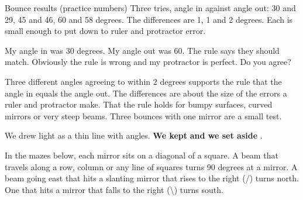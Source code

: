 \begin{worked}{Bounce results (practice numbers)}
Three tries, angle in against angle out: 30 and 29, 45 and 46, 60 and 58 degrees. The differences are 1, 1 and 2 degrees. Each is small enough to put down to ruler and protractor error.
\end{worked}

\begin{multix}[hmm]\multixbot[hmm]\tcblower
My angle in was 30 degrees. My angle out was 60. The rule says they should match. Obviously the rule is wrong and my protractor is perfect. Do you agree?
\end{multix}

{Three different angles agreeing to within 2 degrees supports the rule that the angle in equals the angle out. The differences are about the size of the errors a ruler and protractor make.}
{That the rule holds for bumpy surfaces, curved mirrors or very steep beams. Three bounces with one mirror are a small test.}

\begin{keepbox}
We drew light as a thin line with angles. \textbf{We kept} \wline[3.4cm] \textbf{and we set aside} \wline[3.4cm].
\end{keepbox}

\clearpage

In the mazes below, each mirror sits on a diagonal of a square. A beam that travels along a row, column or any line of squares turns 90 degrees at a mirror. A beam going east that hits a slanting mirror that rises to the right (/) turns north. One that hits a mirror that falls to the right (\textbackslash) turns south.

